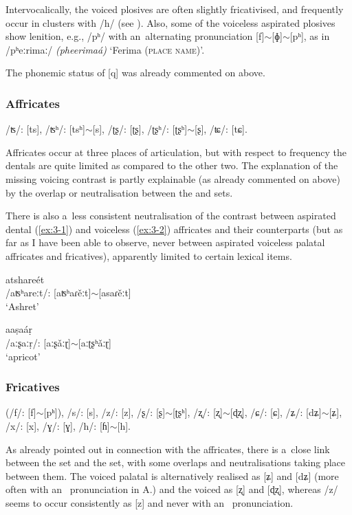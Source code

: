 Intervocalically, the voiced plosives are often slightly fricativised, and frequently occur in clusters with /h/ (see ). Also, some of the voiceless aspirated plosives show lenition, e.g., /pʰ/ with an~alternating pronunciation [f]$\sim$[ɸ]$\sim$[pʰ], as in /pʰeːrimaː/ \textit{(pheerimaá)} `Ferima (\textsc{place name)}'. 


The phonemic status of [q] was already commented on above.


\subsubsection*{Affricates}

/ʦ/: [ts], /ʦʰ/: [tsʰ]$\sim$[s], /ʈʂ/: [ʈʂ], /ʈʂʰ/: [ʈʂʰ]$\sim$[ʂ], /ʨ/: [tɕ].


Affricates occur at three places of articulation, but with respect to frequency the dentals are quite limited as compared to the other two. The explanation of the missing voicing contrast is partly explainable (as already commented on above) by the overlap or neutralisation between the  and  sets. 


There is also a~less consistent neutralisation of the contrast between aspirated dental (\ref{ex:3-1}) and  voiceless (\ref{ex:3-2}) affricates and their  counterparts (but as far as I have been able to observe, never between aspirated voiceless palatal affricates and fricatives), apparently limited to certain lexical items. 

\begin{exe}
\ex
\label{ex:3-1}
\gll atshareét \\
 /aʦʰareːt/: [aʦʰaɾěːt]$\sim$[asaɾěːt] \\
\glt `Ashret'

\ex
\label{ex:3-2}
\gll aaṣaáṛ \\
/aːʂaːṛ/: [aːʂǎːɽ]$\sim$[aːʈʂʰǎːɽ] \\
\glt `apricot'
\end{exe}

\subsubsection*{Fricatives}

(/f/: [f]$\sim$[pʰ]), /s/: [s], /z/: [z], /ʂ/: [ʂ]$\sim$[ʈʂʰ], /ʐ/: [ʐ]$\sim$[ɖʐ], /ɕ/: [ɕ], /ʑ/: [dʑ]$\sim$[ʑ], /x/: [x], /ɣ/: [ɣ], /h/: [ɦ]$\sim$[h].


As already pointed out in connection with the affricates, there is a~close link between the  set and the  set, with some overlaps and neutralisations taking place between them. The voiced palatal  is alternatively realised as [ʑ] and [dʑ] (more often with an~ pronunciation in A.) and the voiced  as [ʐ] and [ɖʐ], whereas /z/ seems to occur consistently as [z] and never with an~ pronunciation.


